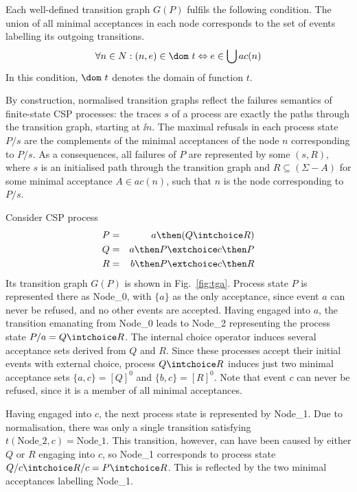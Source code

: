 Each well-defined transition graph $G(P)$ fulfils the following condition. The union of all minimal acceptances in each node corresponds to the set of events labelling its outgoing transitions.
\begin{equation}
\label{eq:wellformedg}
\forall n\in N: (n,e)\in\dom~t \Leftrightarrow e\in\bigcup ac(n)
\end{equation}
In this condition, $\dom~t$ denotes the domain of function $t$. 

By construction, normalised transition graphs reflect the failures semantics of finite-state CSP processes: 
the traces $s$ of a process are exactly the paths through the transition graph, 
starting at $\ii n$. The maximal refusals in each process state $P/s$
 are the complements of 
the minimal acceptances of the node $n$ 
corresponding to $P/s$. As a consequences, all failures 
of $P$ are represented by some $(s,R)$, where $s$ is an initialised path through the transition graph and $R\subseteq (\Sigma-A)$ for some minimal acceptance $A\in ac(n)$, 
such that $n$ is the node corresponding to $P/s$. 

\begin{example}\label{ex:a}
Consider CSP process 
\begin{eqnarray*}
P & = & a \then (Q\intchoice R)
\\
Q & = & a \then P \extchoice c \then P
\\
R & = & b \then P \extchoice c \then R
\end{eqnarray*}
Its transition graph $G(P)$ is shown in Fig.~\ref{fig:tga}. Process state $P$ is represented there as Node\_0, with $\{ a\}$ as the only acceptance, since event $a$ can never be refused, and no other events are accepted. Having engaged into $a$, the transition emanating from Node\_0 leads to Node\_2 representing  the process state 
$P/a = Q\intchoice R$. The internal choice operator induces several acceptance sets derived from $Q$ and $R$. Since these processes accept their initial events with external choice, 
process $Q\intchoice R$ induces just two minimal acceptance sets $\{a,c\} = [Q]^0$ and
$\{b,c\} = [R]^0$. Note that event $c$ can never be refused, since it is a member of all minimal acceptances. 

Having engaged into $c$, the next process state is represented by Node\_1. Due to normalisation, there was only a single transition satisfying 
$t(\text{Node\_2},c) = \text{Node\_1}$. This transition, however, can have been caused 
by either $Q$ or $R$ engaging into $c$, so Node\_1 corresponds to process state
$Q/c \intchoice R/c = P \intchoice R$. This is reflected by the two minimal acceptances
labelling Node\_1. 
\xbox
\end{example}


